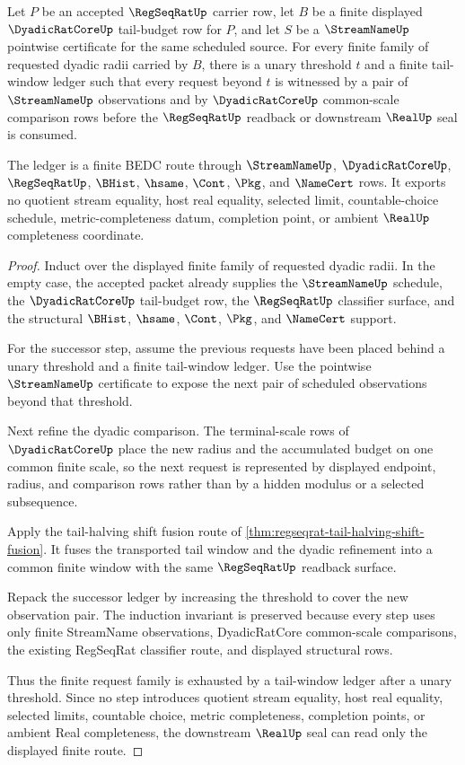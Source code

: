 \begin{theorem}
\label{thm:regular-cauchy-window-exhaustion}
Let $P$ be an accepted $\RegSeqRatUp$ carrier row, let $B$ be a finite displayed $\DyadicRatCoreUp$ tail-budget row for $P$, and let $S$ be a $\StreamNameUp$ pointwise certificate for the same scheduled source. For every finite family of requested dyadic radii carried by $B$, there is a unary threshold $t$ and a finite tail-window ledger such that every request beyond $t$ is witnessed by a pair of $\StreamNameUp$ observations and by $\DyadicRatCoreUp$ common-scale comparison rows before the $\RegSeqRatUp$ readback or downstream $\RealUp$ seal is consumed.

The ledger is a finite BEDC route through $\StreamNameUp$, $\DyadicRatCoreUp$, $\RegSeqRatUp$, $\BHist$, $\hsame$, $\Cont$, $\Pkg$, and $\NameCert$ rows. It exports no quotient stream equality, host real equality, selected limit, countable-choice schedule, metric-completeness datum, completion point, or ambient $\RealUp$ completeness coordinate.
\end{theorem}
\begin{proof}
Induct over the displayed finite family of requested dyadic radii. In the empty case, the accepted packet already supplies the $\StreamNameUp$ schedule, the $\DyadicRatCoreUp$ tail-budget row, the $\RegSeqRatUp$ classifier surface, and the structural $\BHist$, $\hsame$, $\Cont$, $\Pkg$, and $\NameCert$ support.

For the successor step, assume the previous requests have been placed behind a unary threshold and a finite tail-window ledger. Use the pointwise $\StreamNameUp$ certificate to expose the next pair of scheduled observations beyond that threshold.

Next refine the dyadic comparison. The terminal-scale rows of $\DyadicRatCoreUp$ place the new radius and the accumulated budget on one common finite scale, so the next request is represented by displayed endpoint, radius, and comparison rows rather than by a hidden modulus or a selected subsequence.

Apply the tail-halving shift fusion route of \autoref{thm:regseqrat-tail-halving-shift-fusion}. It fuses the transported tail window and the dyadic refinement into a common finite window with the same $\RegSeqRatUp$ readback surface.

Repack the successor ledger by increasing the threshold to cover the new observation pair. The induction invariant is preserved because every step uses only finite StreamName observations, DyadicRatCore common-scale comparisons, the existing RegSeqRat classifier route, and displayed structural rows.

Thus the finite request family is exhausted by a tail-window ledger after a unary threshold. Since no step introduces quotient stream equality, host real equality, selected limits, countable choice, metric completeness, completion points, or ambient Real completeness, the downstream $\RealUp$ seal can read only the displayed finite route.
\end{proof}


